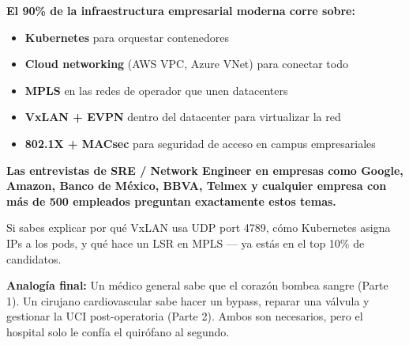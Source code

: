 \begin{moderno}
\textbf{El 90\% de la infraestructura empresarial moderna corre sobre:}

\begin{itemize}
    \item \textbf{Kubernetes} para orquestar contenedores
    \item \textbf{Cloud networking} (AWS VPC, Azure VNet) para conectar todo
    \item \textbf{MPLS} en las redes de operador que unen datacenters
    \item \textbf{VxLAN + EVPN} dentro del datacenter para virtualizar la red
    \item \textbf{802.1X + MACsec} para seguridad de acceso en campus empresariales
\end{itemize}

\vspace{0.5em}
\textbf{Las entrevistas de SRE / Network Engineer en empresas como Google,
Amazon, Banco de México, BBVA, Telmex y cualquier empresa con más de
500 empleados preguntan exactamente estos temas.}

\vspace{0.5em}
 Si sabes explicar por qué VxLAN usa UDP port 4789,
cómo Kubernetes asigna IPs a los pods, y qué hace un LSR en MPLS ---
ya estás en el top 10\% de candidatos.

\vspace{0.5em}
 \textbf{Analogía final:}
Un médico general sabe que el corazón bombea sangre (Parte 1).
Un cirujano cardiovascular sabe hacer un bypass, reparar una válvula
y gestionar la UCI post-operatoria (Parte 2).
Ambos son necesarios, pero el hospital solo le confía el quirófano al segundo.
\end{moderno}

